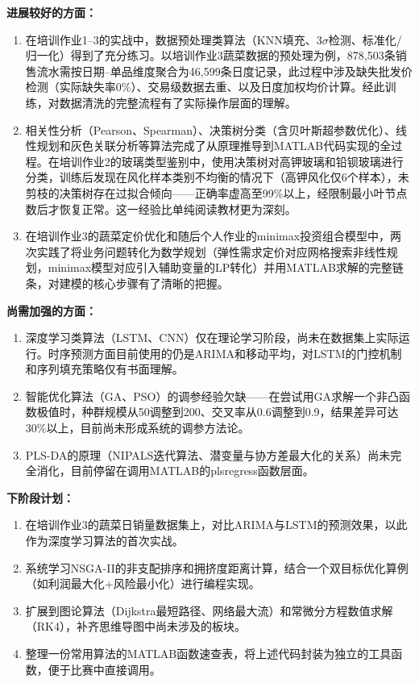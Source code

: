 \documentclass[12pt,a4paper]{ctexart}
\begin{document}
\textbf{进展较好的方面：}
\begin{enumerate}[label=(\arabic*), leftmargin=*]
    \item 在培训作业1--3的实战中，数据预处理类算法（KNN填充、3$\sigma$检测、标准化/归一化）得到了充分练习。以培训作业3蔬菜数据的预处理为例，878,503条销售流水需按日期--单品维度聚合为46,599条日度记录，此过程中涉及缺失批发价检测（实际缺失率0\%）、交易级数据去重、以及日度加权均价计算。经此训练，对数据清洗的完整流程有了实际操作层面的理解。
    \item 相关性分析（Pearson、Spearman）、决策树分类（含贝叶斯超参数优化）、线性规划和灰色关联分析等算法完成了从原理推导到MATLAB代码实现的全过程。在培训作业2的玻璃类型鉴别中，使用决策树对高钾玻璃和铅钡玻璃进行分类，训练后发现在风化样本类别不均衡的情况下（高钾风化仅6个样本），未剪枝的决策树存在过拟合倾向——正确率虚高至99\%以上，经限制最小叶节点数后才恢复正常。这一经验比单纯阅读教材更为深刻。
    \item 在培训作业3的蔬菜定价优化和随后个人作业的minimax投资组合模型中，两次实践了将业务问题转化为数学规划（弹性需求定价对应网格搜索非线性规划，minimax模型对应引入辅助变量的LP转化）并用MATLAB求解的完整链条，对建模的核心步骤有了清晰的把握。
\end{enumerate}

\textbf{尚需加强的方面：}
\begin{enumerate}[label=(\arabic*), leftmargin=*]
    \item 深度学习类算法（LSTM、CNN）仅在理论学习阶段，尚未在数据集上实际运行。时序预测方面目前使用的仍是ARIMA和移动平均，对LSTM的门控机制和序列填充策略仅有书面理解。
    \item 智能优化算法（GA、PSO）的调参经验欠缺——在尝试用GA求解一个非凸函数极值时，种群规模从50调整到200、交叉率从0.6调整到0.9，结果差异可达30\%以上，目前尚未形成系统的调参方法论。
    \item PLS-DA的原理（NIPALS迭代算法、潜变量与协方差最大化的关系）尚未完全消化，目前停留在调用MATLAB的plsregress函数层面。
\end{enumerate}

\textbf{下阶段计划：}
\begin{enumerate}[label=(\arabic*), leftmargin=*]
    \item 在培训作业3的蔬菜日销量数据集上，对比ARIMA与LSTM的预测效果，以此作为深度学习算法的首次实战。
    \item 系统学习NSGA-II的非支配排序和拥挤度距离计算，结合一个双目标优化算例（如利润最大化+风险最小化）进行编程实现。
    \item 扩展到图论算法（Dijkstra最短路径、网络最大流）和常微分方程数值求解（RK4），补齐思维导图中尚未涉及的板块。
    \item 整理一份常用算法的MATLAB函数速查表，将上述代码封装为独立的工具函数，便于比赛中直接调用。
\end{enumerate}
\end{document}
